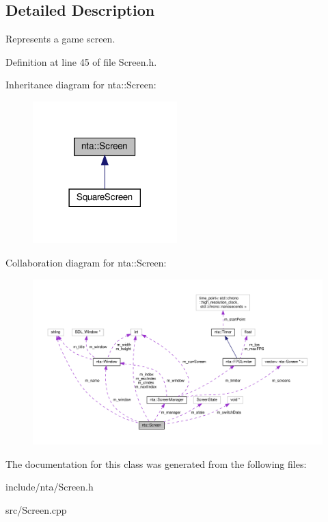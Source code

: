 \subsection{Detailed Description}
Represents a game screen. 

Definition at line 45 of file Screen.\+h.



Inheritance diagram for nta\+:\+:Screen\+:\nopagebreak
\begin{figure}[H]
\begin{center}
\leavevmode
\includegraphics[width=158pt]{d5/d0f/classnta_1_1Screen__inherit__graph}
\end{center}
\end{figure}


Collaboration diagram for nta\+:\+:Screen\+:\nopagebreak
\begin{figure}[H]
\begin{center}
\leavevmode
\includegraphics[width=350pt]{d4/df6/classnta_1_1Screen__coll__graph}
\end{center}
\end{figure}


The documentation for this class was generated from the following files\+:\begin{DoxyCompactItemize}
\item 
include/nta/Screen.\+h\item 
src/Screen.\+cpp\end{DoxyCompactItemize}
